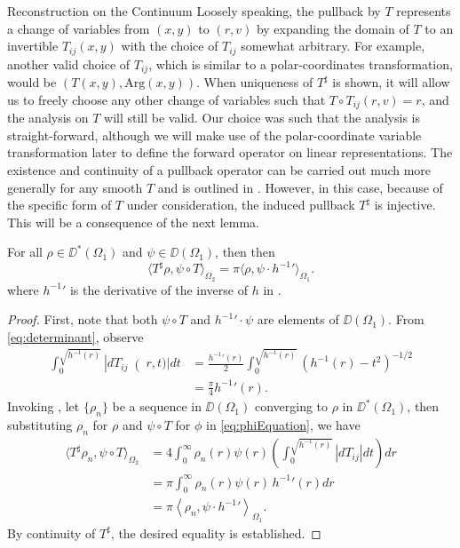\begin{chapter}{Reconstruction on the Continuum}
Loosely speaking, the pullback by $T$ represents a change of variables from $(x,y)$ to $(r,v)$ by expanding the domain of $T$ to an invertible $T_{ij}(x,y)$ with the choice of $T_{ij}$ somewhat arbitrary.  
For example, another valid choice of $T_{ij}$, which is similar to a polar-coordinates transformation, would be $(T(x,y), \mathrm{Arg}(x,y))$.
When uniqueness of $T^\sharp$ is shown, it will allow us to freely choose any other change of variables such that $T \circ T_{ij}(r,v) = r$, and the analysis on $T$ will still be valid.
Our choice was such that the analysis is straight-forward, although we will make use of the polar-coordinate variable transformation later to define the forward operator on linear representations.
The existence and continuity of a pullback operator can be carried out much more generally for any smooth $T$ and is outlined in \cite{hormander1983}.
However, in this case, because of the specific form of $T$ under consideration, the induced pullback $T^\sharp$ is injective. 
This will be a consequence of the next lemma.
\begin{lem} \label{lem:innerProduct}
  For all $\rho\in\DD^*(\Omega_1)$ and $\psi \in \DD(\Omega_1)$, then 
  then
  \begin{equation}
    \langle T^\sharp \rho , \psi \circ T \rangle_{\Omega_2} = \pi \langle \rho,\psi \cdot {h^{-1}}'\rangle_{\Omega_1}.
  \end{equation}
  where ${h^{-1}}'$ is the derivative of the inverse of $h$ in . 
\end{lem}
\begin{proof}
  First, note that both $\psi \circ T$ and ${h^{-1}}'\cdot \psi$ are elements of $\DD(\Omega_1)$.  
  From \eqref{eq:determinant}, observe
  \begin{align}
    \int_0^{\sqrt{h^{-1}(r)}} \left|dT_{ij}\right(r,t)| dt 
    &= \frac{{h^{-1}}'(r)}2 \int_0^{\sqrt{h^{-1}(r)}}\left(h^{-1}(r) - t^2\right)^{-1/2}\nonumber\\
    &= \frac\pi4 {h^{-1}}'(r).
  \end{align}
  Invoking , let $\{\rho_n\}$ be a sequence in $\DD(\Omega_1)$ converging to $\rho$ in $\DD^*(\Omega_1)$, then substituting $\rho_n$ for $\rho$ and $\psi \circ T$ for $\phi$ in \eqref{eq:phiEquation}, we have
  \begin{align}
    \langle T^\sharp \rho_n, \psi \circ T \rangle_{\Omega_2}  &= 4\int_0^\infty \rho_n(r) \psi(r)  \left(\int_0^{\sqrt{h^{-1}(r)}} \left|dT_{ij}\right| dt\right) dr \nonumber \\
      &= \pi \int_0^\infty \rho_n(r) \psi(r)\,{h^{-1}}'(r) dr \nonumber\\
      &= \pi \left\langle\rho_n, \psi  \cdot {h^{-1}}' \right\rangle_{\Omega_1}. \label{eq:pullbackInnerProd}
  \end{align}
  By continuity of $T^\sharp$, the desired equality is established.
\end{proof}


\end{chapter}
